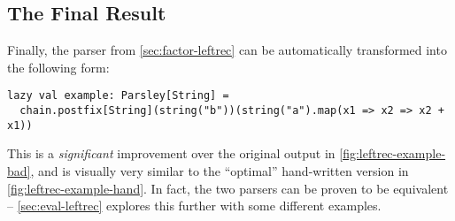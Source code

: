 \documentclass[../../main.tex]{subfiles}
\begin{document}
\pagebreak

\subsection*{The Final Result}
Finally, the  parser from \cref{sec:factor-leftrec} can be automatically transformed into the following form:
\begin{verbatim}
lazy val example: Parsley[String] =
  chain.postfix[String](string("b"))(string("a").map(x1 => x2 => x2 + x1))
\end{verbatim}
%
This is a \emph{significant} improvement over the original output in \cref{fig:leftrec-example-bad}, and is visually very similar to the ``optimal'' hand-written version in \cref{fig:leftrec-example-hand}.
In fact, the two parsers can be proven to be equivalent -- \cref{sec:eval-leftrec} explores this further with some different examples.
\end{document}
